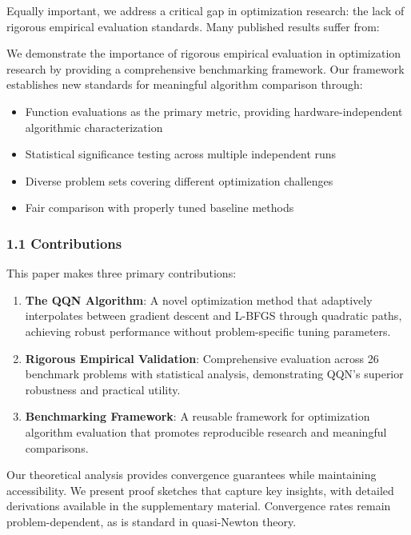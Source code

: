 Equally important, we address a critical gap in optimization research: the lack of rigorous empirical evaluation standards. Many published results suffer from:

We demonstrate the importance of rigorous empirical evaluation in optimization research by providing a comprehensive benchmarking framework. Our framework establishes new standards for meaningful algorithm comparison through:

\begin{itemize}
\tightlist
\item
  Function evaluations as the primary metric, providing hardware-independent algorithmic characterization
\item
  Statistical significance testing across multiple independent runs
\item
  Diverse problem sets covering different optimization challenges
\item
  Fair comparison with properly tuned baseline methods
\end{itemize}

\hypertarget{contributions}{%
\subsubsection{1.1 Contributions}\label{contributions}}

This paper makes three primary contributions:

\begin{enumerate}
\def\labelenumi{\arabic{enumi}.}
\item
  \textbf{The QQN Algorithm}: A novel optimization method that adaptively interpolates between gradient descent and L-BFGS through quadratic paths, achieving robust performance without problem-specific tuning parameters.
\item
  \textbf{Rigorous Empirical Validation}: Comprehensive evaluation across 26 benchmark problems with statistical analysis, demonstrating QQN's superior robustness and practical utility.
\item
  \textbf{Benchmarking Framework}: A reusable framework for optimization algorithm evaluation that promotes reproducible research and meaningful comparisons.
\end{enumerate}

Our theoretical analysis provides convergence guarantees while maintaining accessibility.
We present proof sketches that capture key insights, with detailed derivations available in the supplementary material.
Convergence rates remain problem-dependent, as is standard in quasi-Newton theory.

